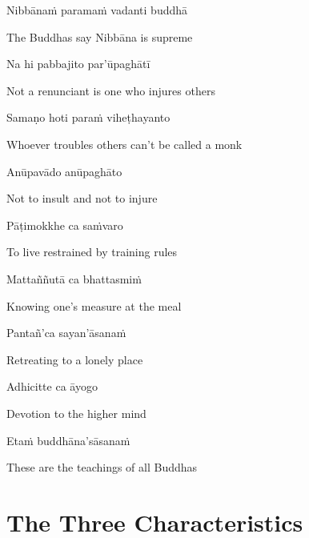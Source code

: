 Nibbānaṁ paramaṁ vadanti buddhā

\begin{english}
  The Buddhas say Nibbāna is supreme
\end{english}

Na hi pabbajito par'ūpaghātī

\begin{english}
  Not a renunciant is one who injures others
\end{english}

\ifninebythirteen\clearpage\fi

Samaṇo hoti paraṁ viheṭhayanto

\begin{english}
  Whoever troubles others can't be called a monk
\end{english}

Anūpavādo anūpaghāto

\begin{english}
  Not to insult and not to injure
\end{english}

Pāṭimokkhe ca saṁvaro

\begin{english}
  To live restrained by training rules
\end{english}

Mattaññutā ca bhattasmiṁ

\begin{english}
  Knowing one's measure at the meal
\end{english}

Pantañ'ca sayan'āsanaṁ

\begin{english}
  Retreating to a lonely place
\end{english}

Adhicitte ca āyogo

\begin{english}
  Devotion to the higher mind
\end{english}

Etaṁ buddhāna'sāsanaṁ

\begin{english}
  These are the teachings of all Buddhas
\end{english}

\suttaRef{[Dhp 183-185]}

\ifdigital{}\fi



\section{The Three Characteristics}
\label{three-characteristics}

